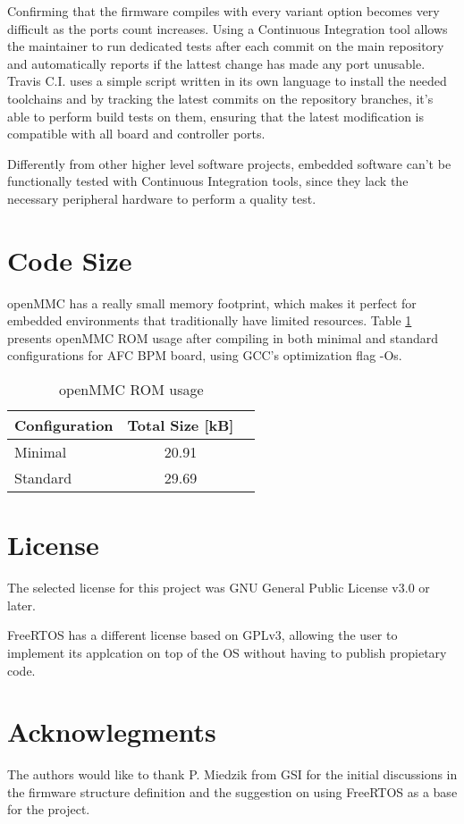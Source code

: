 \documentclass[a4paper,
              ]{jacow}
\begin{document}
Confirming that the firmware compiles with every variant option becomes very difficult as the ports count increases.
Using a Continuous Integration tool allows the maintainer to run dedicated tests after each commit on the main repository and automatically reports if the lattest change has made any port unusable.
Travis C.I. uses a simple script written in its own language to install the needed toolchains and by tracking the latest commits on the repository branches, it's able to perform build tests on them, ensuring that the latest modification is compatible with all board and controller ports.

Differently from other higher level software projects, embedded software can't be functionally tested with Continuous Integration tools, since they lack the necessary peripheral hardware to perform a quality test.

\section{Code Size}
openMMC has a really small memory footprint, which makes it perfect for embedded environments that traditionally have limited resources.
Table \ref{table:rom_usage} presents openMMC ROM usage after compiling in both minimal and standard configurations for AFC BPM board, using GCC's optimization flag -Os.

\begin{table}[hbt]
  \centering
  \caption{openMMC ROM usage}
  \label{table:rom_usage}
  \begin{tabular}{lcc}
    \toprule
    \textbf{Configuration} & \textbf{Total Size [kB]} \\
    \midrule
    Minimal               & 20.91  \\
    Standard              & 29.69  \\
       \bottomrule
  \end{tabular}
\end{table}

\section{License}
The selected license for this project was GNU General Public License v3.0 or later.

FreeRTOS has a different license based on GPLv3, allowing the user to implement its applcation on top of the OS without having to publish propietary code.

\section{Acknowlegments}
The authors would like to thank P. Miedzik from GSI for the initial discussions in the firmware structure definition and the suggestion on using FreeRTOS as a base for the project.
\end{document}

